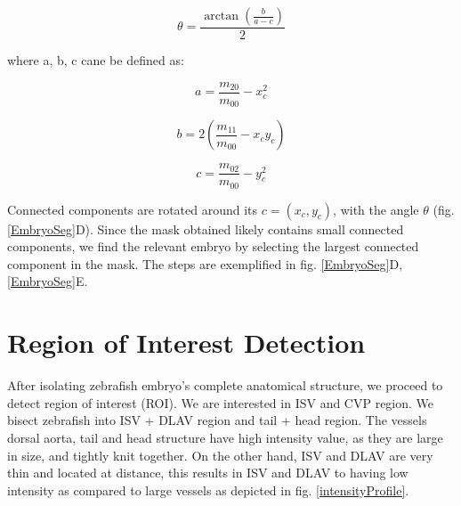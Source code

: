 \begin{equation}
\theta = \frac{\arctan(\frac{b}{a-c})}{2}
\end{equation}

where a, b, c cane be defined as:

\begin{displaymath}a = \frac{m_{20}}{m_{00}}  - x_{c}^2\end{displaymath}

\begin{displaymath}b = 2(\frac{m_{11}}{m_{00}}  - x_{c}y_{c})\end{displaymath}

\begin{displaymath}c = \frac{m_{02}}{m_{00}}  - y_{c}^2\end{displaymath}

Connected components are rotated around its $c = (x_{c}, y_{c})$, with the angle $\theta$ (fig. \ref{EmbryoSeg}D). Since the mask obtained likely contains small connected components, we find the relevant embryo by selecting the largest connected component in the mask. The steps are exemplified in fig. \ref{EmbryoSeg}D, \ref{EmbryoSeg}E.

\section{Region of Interest Detection}\label{sec:roi}
After isolating zebrafish embryo's complete anatomical structure, we proceed to detect region of interest (ROI). We are interested in ISV and CVP region. We bisect zebrafish into ISV + DLAV region and tail + head region. The vessels dorsal aorta, tail and head structure have high intensity value, as they are large in size, and tightly knit together. On the other hand, ISV and DLAV are very thin and located at distance, this results in ISV and DLAV to having low intensity as compared to large vessels as depicted in fig. \ref{intensityProfile}.

